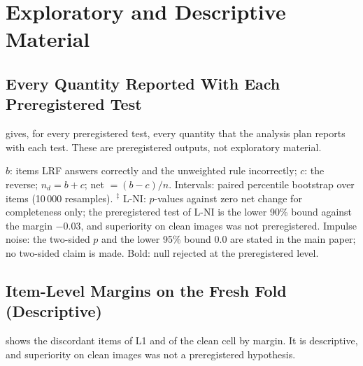 \documentclass[journal,onecolumn]{IEEEtran}
\theoremstyle{plain}
\begin{document}
\section{Exploratory and Descriptive Material}\label{sup:study2}

\subsection{Every Quantity Reported With Each Preregistered Test}\label{sup:testsfull}
 gives, for every preregistered test, every quantity that the analysis plan reports with each test.
These are preregistered outputs, not exploratory material.

\begin{table}[!htbp]
\centering
\caption{Every Preregistered Test With All Reported Quantities}
\label{stab:testsfull}
\footnotesize
\setlength{\tabcolsep}{3pt}
\resizebox{\textwidth}{!}{}

\vspace{2pt}
\parbox{\textwidth}{\scriptsize $b$: items LRF answers correctly and the unweighted rule incorrectly; $c$: the reverse; $n_d=b+c$; net
$=(b-c)/n$. Intervals: paired percentile bootstrap over items (10\,000 resamples). $^{\ddagger}$ L-NI: $p$-values against zero net change
for completeness only; the preregistered test of L-NI is the lower 90\% bound against the margin $-0.03$, and superiority on clean
images was not preregistered. Impulse noise: the two-sided $p$ and the lower 95\% bound 0.0 are stated in the main paper; no two-sided
claim is made. Bold: null rejected at the preregistered level.}
\end{table}

\subsection{Item-Level Margins on the Fresh Fold (Descriptive)}\label{sup:margins}
 shows the discordant items of L1 and of the clean cell by margin. It is descriptive, and superiority on clean images
was not a preregistered hypothesis.
\end{document}
